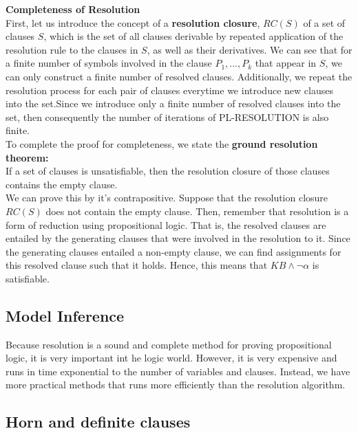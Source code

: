 \documentclass[12pt]{article}
\begin{document}
\textbf{Completeness of Resolution}\\

First, let us introduce the concept of a \textbf{resolution closure}, $RC(S)$ of a set of clauses $S$, which is the set of all clauses derivable by repeated application of the resolution rule to the clauses in $S$, as well as their derivatives. We can see that for a finite number of symbols involved in the clause $P_1, ..., P_k$ that appear in $S$, we can only construct a finite number of resolved clauses. Additionally, we repeat the resolution process for each pair of clauses everytime we introduce new clauses into the set.Since we introduce only a finite number of resolved clauses into the set, then consequently the number of iterations of \textsc{PL-RESOLUTION} is also finite.\\

To complete the proof for completeness, we state the \textbf{ground resolution theorem:}\\

If a set of clauses is unsatisfiable, then the resolution closure of those clauses contains the empty clause.\\

We can prove this by it's contrapositive. Suppose that the resolution closure $RC(S)$ does not contain the empty clause. Then, remember that resolution is a form of reduction using propositional logic. That is, the resolved clauses are entailed by the generating clauses that were involved in the resolution to it. Since the generating clauses entailed a non-empty clause, we can find assignments for this resolved clause such that it holds. Hence, this means that  $KB \land \lnot \alpha$ is satisfiable.

\subsection{Model Inference}

Because resolution is a sound and complete method for proving propositional logic, it is very important int he logic world. However, it is very expensive and runs in time exponential to the number of variables and clauses. Instead, we have more practical methods that runs more efficiently than the resolution algorithm.

\subsection{Horn and definite clauses}
\end{document}
